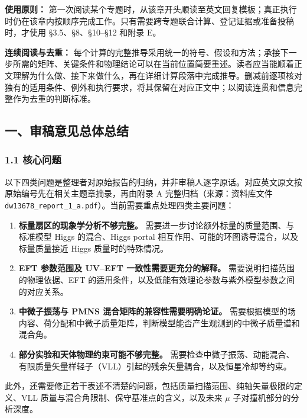 \documentclass[
  chinese,
  UTF8]{ctexart}
\providecommand{\tightlist}{%
  \setlength{\itemsep}{0pt}\setlength{\parskip}{0pt}}
\begin{document}
\textbf{使用原则：}
第一次阅读某个专题时，从该章开头顺读至英文回复模板；真正执行时仍在该章内按顺序完成工作。只有需要跨专题联合计算、登记证据或准备投稿时，才使用
§3.5、§8、§10--§12 和附录 E。

\textbf{连续阅读与去重：}
每个计算的完整推导采用统一的符号、假设和方法；承接下一步所需的矩阵、关键条件和物理结论可以在当前位置简要重述。读者应当能顺着正文理解为什么做、接下来做什么，再在详细计算段落中完成推导。删减前逐项核对独有的适用条件、例外和执行要求，将其保留在对应正文中；以阅读连贯和信息完整作为去重的判断标准。

\subsection{一、审稿意见总体总结}\label{ux4e00ux5ba1ux7a3fux610fux89c1ux603bux4f53ux603bux7ed3}

\subsubsection{1.1 核心问题}\label{ux6838ux5fc3ux95eeux9898}

以下四类问题是整理者对原始报告的归纳，并非审稿人逐字原话。对应英文原文按原始编号先在相关主题章摘录，再由附录
A 完整归档（来源：资料库文件
\texttt{dw13678\_report\_1\_a.pdf}）。当前需要重点处理四类主要问题：

\begin{enumerate}
\def\labelenumi{\arabic{enumi}.}
\tightlist
\item
  \textbf{标量扇区的现象学分析不够完整。}
  需要进一步讨论额外标量的质量范围、与标准模型 Higgs 的混合、Higgs
  portal 相互作用、可能的环图诱导混合，以及标量质量接近 Higgs
  质量时的特殊情况。
\item
  \textbf{EFT 参数范围及 UV--EFT 一致性需要更充分的解释。}
  需要说明扫描范围的物理依据、EFT
  的适用条件，以及低能有效理论参数与紫外模型参数之间的对应关系。
\item
  \textbf{中微子振荡与 PMNS 混合矩阵的兼容性需要明确论证。}
  需要根据模型的场内容、荷分配和中微子质量矩阵，判断模型能否产生观测到的中微子质量谱和混合角。
\item
  \textbf{部分实验和天体物理约束可能不够完整。}
  需要检查中微子振荡、动能混合、有限质量矢量样轻子（VLL）引起的残余矢量耦合，以及恒星冷却等约束。
\end{enumerate}

此外，还需要修正若干表述不清楚的问题，包括质量扫描范围、纯轴矢量极限的定义、VLL
质量与混合角限制、保守基准点的含义，以及未来 \ensuremath{\mu}
子对撞机部分的分析深度。
\end{document}
